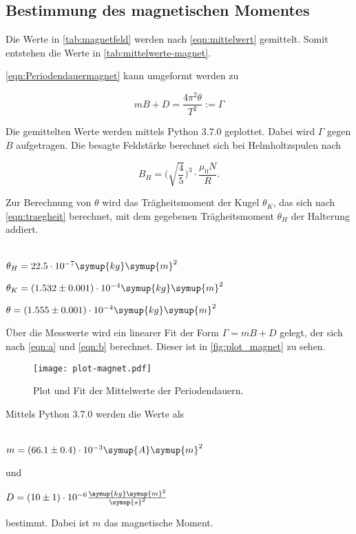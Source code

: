 \subsection{Bestimmung des magnetischen Momentes}



Die Werte in \autoref{tab:magnetfeld} werden nach \eqref{eqn:mittelwert} gemittelt. Somit entstehen die Werte in \autoref{tab:mittelwerte-magnet}.



\eqref{eqn:Periodendauermagnet} kann umgeformt werden zu

\begin{equation}
  mB + D = \frac{4 \pi^2 \theta}{T^2} := \Gamma
\end{equation}

Die gemittelten Werte werden mittels Python 3.7.0 geplottet. Dabei wird $\Gamma$ gegen $B$ aufgetragen. Die besagte Feldstärke berechnet sich bei Helmholtzspulen nach

\begin{equation}
    B_H = \bigg( \sqrt{\frac{4}{5}} \bigg)^3 \cdot \frac{\mu_0 N}{R}.
\end{equation}

Zur Berechnung von $\theta$ wird das Trägheitsmoment der Kugel $\theta_K$, das sich nach \eqref{eqn:traegheit} berechnet, mit dem gegebenen Trägheitsmoment $\theta_H$ der Halterung addiert.
\\ \\
\centerline{$\theta_H = 22.5 \cdot 10^{-7} \symup{kg} \symup{m}^2$}

\centerline{$\theta_K = (1.532 \pm 0.001) \cdot 10^{-4} \symup{kg} \symup{m}^2$}

\centerline{$\theta = (1.555 \pm 0.001) \cdot 10^{-4} \symup{kg} \symup{m}^2$}

Über die Messwerte wird ein linearer Fit der Form $\Gamma = mB + D$ gelegt, der sich nach \eqref{eqn:a} und \eqref{eqn:b} berechnet.
Dieser ist in \autoref{fig:plot_magnet} zu sehen.

\begin{figure}
  \centering
  \texttt{[image: plot-magnet.pdf]}
  \caption{Plot und Fit der Mittelwerte der Periodendauern.}
  \label{fig:plot_magnet}
\end{figure}

Mittels Python 3.7.0 werden die Werte als
\\ \\
\centerline{$m = (66.1 \pm 0.4) \cdot 10^{-3} \symup{A}\symup{m}^2$}

und

\centerline{$D = (10 \pm 1) \cdot 10^{-6} \frac{\symup{kg} \symup{m}^2}{\symup{s}^2}$}

bestimmt.
Dabei ist $m$ das magnetische Moment.
